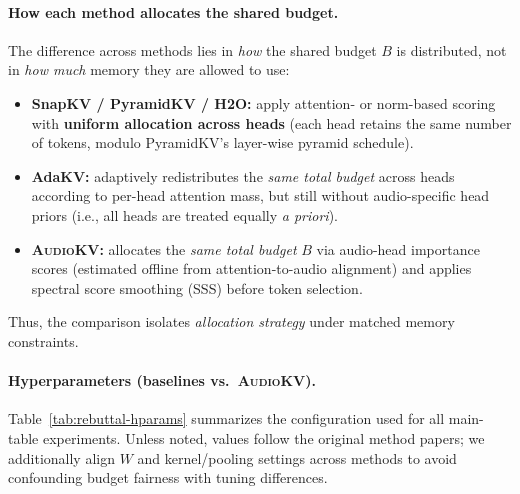 \begin{answer}
    \paragraph{How each method allocates the shared budget.}
    The difference across methods lies in \emph{how} the shared budget $B$ is distributed, not in \emph{how much} memory they are allowed to use:
    \begin{itemize}
        \item \textbf{SnapKV / PyramidKV / H2O:} apply attention- or norm-based scoring with \textbf{uniform allocation across heads} (each head retains the same number of tokens, modulo PyramidKV's layer-wise pyramid schedule).
        \item \textbf{AdaKV:} adaptively redistributes the \emph{same total budget} across heads according to per-head attention mass, but still without audio-specific head priors (i.e., all heads are treated equally \emph{a priori}).
        \item \textbf{\textsc{AudioKV}:} allocates the \emph{same total budget} $B$ via audio-head importance scores (estimated offline from attention-to-audio alignment) and applies spectral score smoothing (SSS) before token selection.
    \end{itemize}
    Thus, the comparison isolates \emph{allocation strategy} under matched memory constraints.
    
    \paragraph{Hyperparameters (baselines vs.\ \textsc{AudioKV}).}
    Table~\ref{tab:rebuttal-hparams} summarizes the configuration used for all main-table experiments.
    Unless noted, values follow the original method papers; we additionally align $W$ and kernel/pooling settings across methods to avoid confounding budget fairness with tuning differences.
    
    \begin{table}[t]
    \centering
    \small
    \setlength{\tabcolsep}{4pt}
    \caption{\textbf{Hyperparameters and budget allocation for all methods in the main table.}
    All methods share the same retention ratio $\rho$ and dynamic budget $B=\lfloor \rho N_{\text{prefill}} \rfloor$.}
    \label{tab:rebuttal-hparams}
    

\end{table}
\end{answer}
